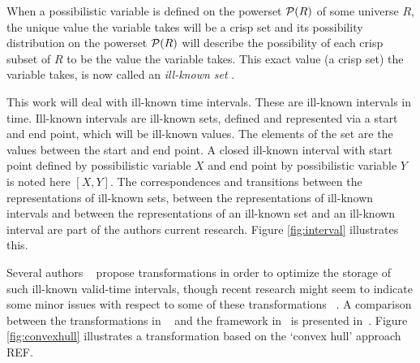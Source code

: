 When a possibilistic variable is defined on the powerset $\mathcal{P}(R)$ of some universe $R$, the unique value the variable takes will be a crisp set and its possibility distribution on the powerset $\mathcal{P}(R)$ will describe the possibility of each crisp subset of $R$ to be the value the variable takes. This exact value (a crisp set) the variable takes, is now called an \emph{ill-known set} \cite{Dubois88b}.

This work will deal with ill-known time intervals. These are ill-known intervals in time. Ill-known intervals are ill-known sets, defined and represented via a start and end point, which will be ill-known values. The elements of the set are the values between the start and end point. A closed ill-known interval with start point defined by possibilistic variable $X$ and end point by possibilistic variable $Y$ is noted here $\left[X, Y\right]$. The correspondences and transitions between the representations of ill-known sets, between the representations of ill-known intervals and between the representations of an ill-known set and an ill-known interval are part of the authors current research. Figure \ref{fig:interval} illustrates this.


Several authors ~\cite{garrido2009} propose transformations in order to optimize the storage of such ill-known valid-time intervals, though recent research might seem to indicate some minor issues with respect to some of these transformations ~\cite{Pon11}. A comparison between the transformations in ~\cite{garrido2009} and the framework in~\cite{Pon11} is presented in~\cite{pon12}. Figure \ref{fig:convexhull} illustrates a transformation based on the `convex hull' approach REF.




